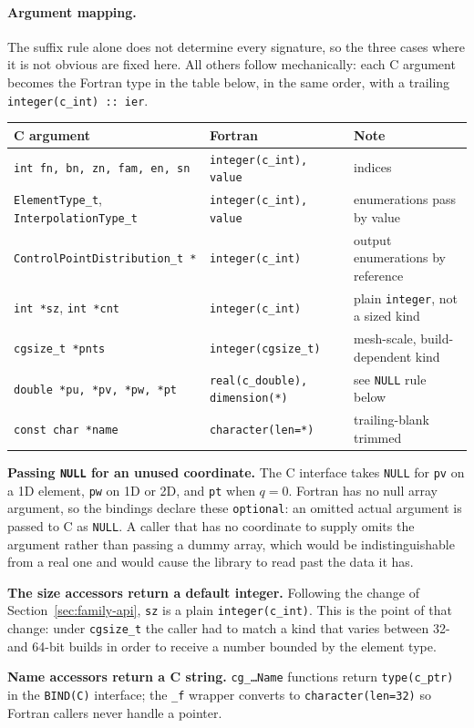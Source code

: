 \documentclass[11pt,letterpaper]{article}
\newif\ifvfourdraft
\newenvironment{v4block}{\ifvfourdraft\color{v4violet}\fi\ignorespaces}{\par}
\newcommand{\vfourmark}{\ifvfourdraft\textcolor{v4violet}{\textbf{[v4]}}\ \fi}
\begin{document}
\begin{v4block}
\paragraph{\vfourmark Argument mapping.}
The suffix rule alone does not determine every signature, so the three cases where
it is not obvious are fixed here.  All others follow mechanically: each C argument
becomes the Fortran type in the table below, in the same order, with a trailing
\texttt{integer(c\_int) :: ier}.

\smallskip
\begin{tabular}{@{} l l l @{}}
\toprule
\textbf{C argument} & \textbf{Fortran} & \textbf{Note} \\
\midrule
\texttt{int fn, bn, zn, fam, en, sn}
  & \texttt{integer(c\_int), value}      & indices \\
\texttt{ElementType\_t}, \texttt{InterpolationType\_t}
  & \texttt{integer(c\_int), value}      & enumerations pass by value \\
\texttt{ControlPointDistribution\_t *}
  & \texttt{integer(c\_int)}             & output enumerations by reference \\
\texttt{int *sz}, \texttt{int *cnt}
  & \texttt{integer(c\_int)}             & plain \texttt{integer}, not a sized kind \\
\texttt{cgsize\_t *pnts}
  & \texttt{integer(cgsize\_t)}          & mesh-scale, build-dependent kind \\
\texttt{double *pu, *pv, *pw, *pt}
  & \texttt{real(c\_double), dimension(*)} & see \texttt{NULL} rule below \\
\texttt{const char *name}
  & \texttt{character(len=*)}            & trailing-blank trimmed \\
\bottomrule
\end{tabular}

\smallskip
\noindent\textbf{Passing \texttt{NULL} for an unused coordinate.}  The C interface
takes \texttt{NULL} for \texttt{pv} on a 1D element, \texttt{pw} on 1D or 2D, and
\texttt{pt} when $q = 0$.  Fortran has no null array argument, so the bindings
declare these \texttt{optional}: an omitted actual argument is passed to C as
\texttt{NULL}.  A caller that has no coordinate to supply omits the argument
rather than passing a dummy array, which would be indistinguishable from a real
one and would cause the library to read past the data it has.

\noindent\textbf{The size accessors return a default integer.}  Following the
change of Section~\ref{sec:family-api}, \texttt{sz} is a plain
\texttt{integer(c\_int)}.  This is the point of that change: under
\texttt{cgsize\_t} the caller had to match a kind that varies between 32- and
64-bit builds in order to receive a number bounded by the element type.

\noindent\textbf{Name accessors return a C string.}  \texttt{cg\_\ldots Name}
functions return \texttt{type(c\_ptr)} in the \texttt{BIND(C)} interface; the
\texttt{\_f} wrapper converts to \texttt{character(len=32)} so Fortran callers
never handle a pointer.
\end{v4block}
\end{document}
